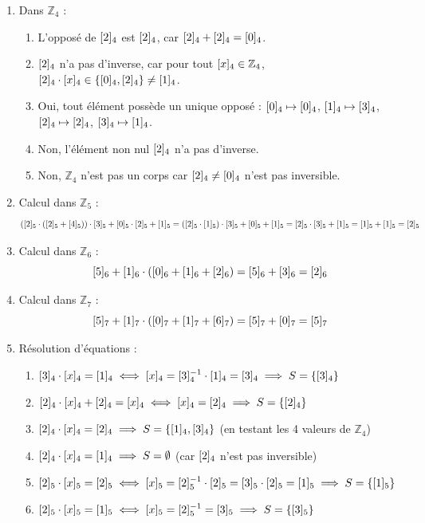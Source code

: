 \begin{enumerate}[label=\thechapter.\arabic*, font=\bfseries, itemsep=7mm,labelsep*=3mm,left=0mm]
\begin{enumerate}[label=\alph*),itemsep=5mm,left=-1mm,labelsep*=2mm]
\item Dans $\mathbb{Z}_4$ :
\begin{enumerate}[label=\arabic*)]
	\item L'opposé de $\cl[4]{2}$ est $\cl[4]{2}$, car $\cl[4]{2} + \cl[4]{2} = \cl[4]{0}$.
	\item $\cl[4]{2}$ n'a pas d'inverse, car pour tout $\cl[4]{x} \in \mathbb{Z}_4$, $\cl[4]{2} \cdot \cl[4]{x} \in \{\cl[4]{0}, \cl[4]{2}\} \neq \cl[4]{1}$.
	\item Oui, tout élément possède un unique opposé : $\cl[4]{0} \mapsto \cl[4]{0}$, $\cl[4]{1} \mapsto \cl[4]{3}$, $\cl[4]{2} \mapsto \cl[4]{2}$, $\cl[4]{3} \mapsto \cl[4]{1}$.
	\item Non, l'élément non nul $\cl[4]{2}$ n'a pas d'inverse.
	\item Non, $\mathbb{Z}_4$ n'est pas un corps car $\cl[4]{2} \neq \cl[4]{0}$ n'est pas inversible.
\end{enumerate}

\item Calcul dans $\mathbb{Z}_5$ :
\[
\left(\cl[5]{2} \cdot (\cl[5]{2} + \cl[5]{4})\right) \cdot \cl[5]{3} + \cl[5]{0} \cdot \cl[5]{2} + \cl[5]{1} = \left(\cl[5]{2} \cdot \cl[5]{1}\right) \cdot \cl[5]{3} + \cl[5]{0} + \cl[5]{1} = \cl[5]{2} \cdot \cl[5]{3} + \cl[5]{1} = \cl[5]{1} + \cl[5]{1} = \cl[5]{2}
\]

\item Calcul dans $\mathbb{Z}_6$ :
\[
\cl[6]{5} + \cl[6]{1} \cdot \left(\cl[6]{0} + \cl[6]{1} + \cl[6]{2}\right) = \cl[6]{5} + \cl[6]{3} = \cl[6]{2}
\]

\item Calcul dans $\mathbb{Z}_7$ :
\[
\cl[7]{5} + \cl[7]{1} \cdot \left(\cl[7]{0} + \cl[7]{1} + \cl[7]{6}\right) = \cl[7]{5} + \cl[7]{0} = \cl[7]{5}
\]

\item Résolution d'équations :
\begin{enumerate}[label=\arabic*)]
	\item $\cl[4]{3} \cdot \cl[4]{x} = \cl[4]{1} \iff \cl[4]{x} = \cl[4]{3}^{-1} \cdot \cl[4]{1} = \cl[4]{3} \implies S = \{\cl[4]{3}\}$
	\item $\cl[4]{2} \cdot \cl[4]{x} + \cl[4]{2} = \cl[4]{x} \iff \cl[4]{x} = \cl[4]{2} \implies S = \{\cl[4]{2}\}$
	\item $\cl[4]{2} \cdot \cl[4]{x} = \cl[4]{2} \implies S = \{\cl[4]{1}, \cl[4]{3}\}$ (en testant les 4 valeurs de $\mathbb{Z}_4$)
	\item $\cl[4]{2} \cdot \cl[4]{x} = \cl[4]{1} \implies S = \emptyset$ (car $\cl[4]{2}$ n'est pas inversible)
	\item $\cl[5]{2} \cdot \cl[5]{x} = \cl[5]{2} \iff \cl[5]{x} = \cl[5]{2}^{-1} \cdot \cl[5]{2} = \cl[5]{3} \cdot \cl[5]{2} = \cl[5]{1} \implies S = \{\cl[5]{1}\}$
	\item $\cl[5]{2} \cdot \cl[5]{x} = \cl[5]{1} \iff \cl[5]{x} = \cl[5]{2}^{-1} = \cl[5]{3} \implies S = \{\cl[5]{3}\}$
\end{enumerate}
\end{enumerate}


\end{enumerate}
